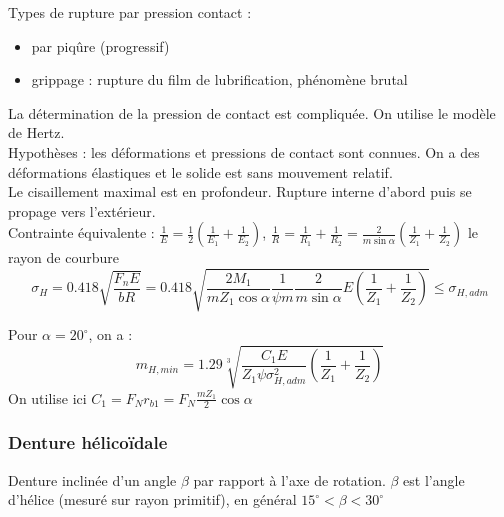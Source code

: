 \documentclass[../main.tex]{subfiles}
\begin{document}
Types de rupture par pression contact : \begin{itemize}
    \item par piqûre (progressif)\\
    \item grippage : rupture du film de lubrification, phénomène brutal\\
\end{itemize}

La détermination de la pression de contact est compliquée. On utilise le modèle de Hertz.\\
Hypothèses : les déformations et pressions de contact sont connues. On a des déformations élastiques et le solide est sans mouvement relatif.\\
Le cisaillement maximal est en profondeur. Rupture interne d'abord puis se propage vers l'extérieur.\\
Contrainte équivalente : $\frac{1}{E} = \frac{1}{2}(\frac{1}{E_1}+\frac{1}{E_2})$, $\frac{1}{R} = \frac{1}{R_1}+\frac{1}{R_2} = \frac{2}{m\sin{\alpha}} (\frac{1}{Z_1}+\frac{1}{Z_2})$ le rayon de courbure\\
\begin{equation}
    \sigma_H = 0.418 \sqrt{\frac{F_nE}{bR}} = 0.418 \sqrt{\frac{2M_1}{m Z_1 \cos{\alpha}} \frac{1}{\psi m} \frac{2}{m\sin{\alpha}}E(\frac{1}{Z_1}+\frac{1}{Z_2})} \leq \sigma_{H,adm}
\end{equation}

Pour $\alpha = 20^\circ$, on a : \\
\begin{equation}
    m_{H,min} = 1.29 \sqrt[3]{\frac{C_1E}{Z_1 \psi \sigma_{H,adm}^2}(\frac{1}{Z_1}+\frac{1}{Z_2})}
\end{equation}
On utilise ici $C_1 = F_N r_{b1} = F_N \frac{mZ_1}{2}\cos{\alpha}$\\

\subsubsection{Denture hélicoïdale}
Denture inclinée d'un angle $\beta$ par rapport à l'axe de rotation. $\beta$ est l'angle d'hélice (mesuré sur rayon primitif), en général $15^\circ < \beta < 30^\circ$\\
\end{document}
